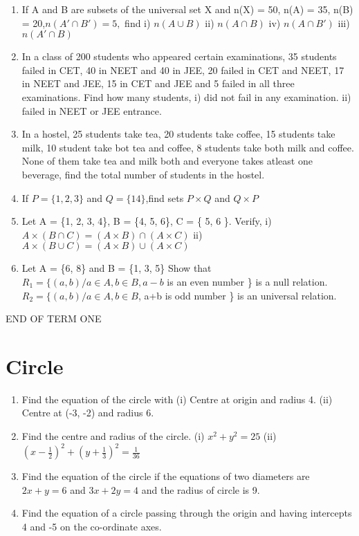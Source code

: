 \documentclass[14pt]{article}
\begin{document}
\begin{multicols}{2}
\begin{enumerate}[resume]
\item If A and B are subsets of the universal set X and n(X) = 50, n(A) = 35, n(B) = 20,$ n(A'\cap B') = 5,$ find i) $n (A\cup B)$ ii) $n(A\cap B)$
iv) $ n(A\cap B')$
iii) $ n(A'\cap B) $

\item In a class of 200 students who appeared
certain examinations, 35 students failed
in CET, 40 in NEET and 40 in JEE,
20 failed in CET and NEET, 17 in NEET
and JEE, 15 in CET and JEE and 5 failed
in all three examinations. Find how many
students,
i)	did not fail in any examination.
ii) failed in NEET or JEE entrance.
		 
		 
\item In a hostel, 25 students take tea, 20 students
take coffee, 15 students take milk, 10
student take bot tea and coffee, 8 students
take both milk and coffee. None of them
take tea and milk both and everyone takes
atleast one beverage, find the total number
of students in the hostel.

\item If $P = \{1, 2, 3 \} $ and $Q = \{14 \}$,find sets $P \times Q $ and $Q \times P$

\item Let A = \{1, 2, 3, 4\}, B = \{4, 5, 6\}, C = \{ 5, 6 \}.
 Verify, i) $A \times (B \cap C) = (A \times B) \cap (A \times C)$				
ii) $ A \times (B \cup C) = (A \times B) \cup (A \times C)$

\item Let A = \{6, 8\} and B = \{1, 3, 5\} Show that $ R_1 = \{ (a, b) / a \in A, b\in B, a - b$
is an even number \} is a null relation.
$R_2 = \{(a, b)/a \in A, b \in B$, a+b is odd number \}
is an universal relation.
\end{enumerate} 

END OF TERM ONE

\section{Circle}
\noindent
\begin{enumerate}[resume]
 \item Find the equation of the circle with
(i) Centre at origin and radius 4.
(ii) Centre at (-3, -2) and radius 6.
\item Find the centre and radius of the circle.
(i) $x^2 + y^2 = 25$ (ii) $\left(x -\frac{1}{2}\right)^2 + \left(y +\frac{1}{3}\right)^2 = \frac{1}{36}$
\item Find the equation of the circle if the equations of two diameters are $2x + y = 6$ and $3x + 2y = 4$ and the radius of circle is 9.
\item Find the equation of a circle passing through the origin and having intercepts 4 and -5 on
the co-ordinate axes.


\end{enumerate}
\end{multicols}
\end{document}

